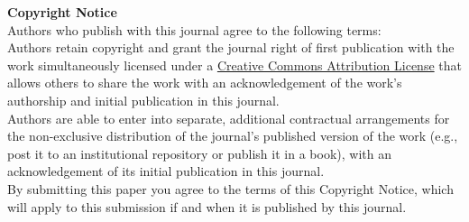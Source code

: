 \documentclass{jors}
\begin{document}
{ \bf Copyright Notice} \\
Authors who publish with this journal agree to the following terms: \\

Authors retain copyright and grant the journal right of first publication with the work simultaneously licensed under a  \href{http://creativecommons.org/licenses/by/3.0/}{Creative Commons Attribution License} that allows others to share the work with an acknowledgement of the work's authorship and initial publication in this journal. \\

Authors are able to enter into separate, additional contractual arrangements for the non-exclusive distribution of the journal's published version of the work (e.g., post it to an institutional repository or publish it in a book), with an acknowledgement of its initial publication in this journal. \\

By submitting this paper you agree to the terms of this Copyright Notice, which will apply to this submission if and when it is published by this journal.
\end{document}
